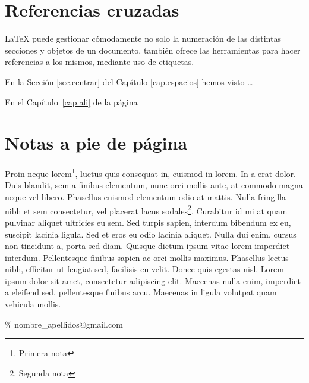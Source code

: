 \documentclass[11pt,a4paper]{report}
\begin{document}
\section{Referencias cruzadas} 


\LaTeX{} puede gestionar cómodamente no solo la numeración de las distintas secciones y objetos de un documento, también ofrece las herramientas para hacer referencias a los mismos, mediante uso de etiquetas. 


\medskip


En la Sección \ref{sec.centrar} del Capítulo \ref{cap.espacios} hemos visto  \dots{}

\medskip


En el Capítulo~\ref{cap.ali} de la página~\pageref{cap.ali}



\section{Notas a pie de página} 


Proin neque lorem\footnote {Primera nota}, luctus quis consequat in, euismod in lorem. In a erat dolor. Duis blandit, sem a finibus elementum, nunc orci mollis ante, at commodo magna neque vel libero. Phasellus euismod elementum odio at mattis. Nulla fringilla nibh et sem consectetur, vel placerat lacus sodales\footnote{Segunda nota}. Curabitur id mi at quam pulvinar aliquet ultricies eu sem. Sed turpis sapien, interdum bibendum ex eu, suscipit lacinia ligula. Sed et eros eu odio lacinia aliquet. Nulla dui enim, cursus non tincidunt a, porta sed diam. Quisque dictum ipsum vitae lorem imperdiet interdum. Pellentesque finibus sapien ac orci mollis maximus. Phasellus lectus nibh, efficitur ut feugiat sed, facilisis eu velit. Donec quis egestas nisl. Lorem ipsum dolor sit amet, consectetur adipiscing elit. Maecenas nulla enim, imperdiet a eleifend sed, pellentesque finibus arcu. Maecenas in ligula volutpat quam vehicula mollis.

\bigskip

\% \qquad nombre\_apellidos@gmail.com
\end{document}
